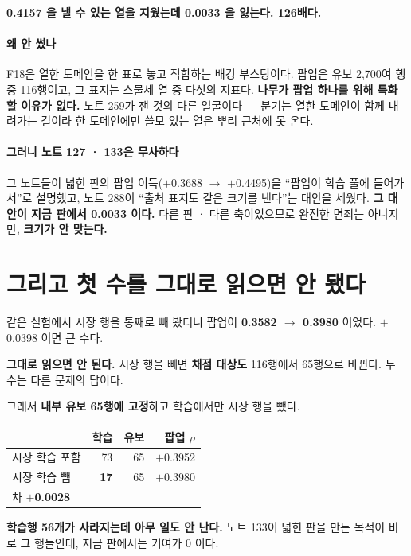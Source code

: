 \documentclass[10pt]{article}
\begin{document}
\textbf{0.4157 을 낼 수 있는 열을 지웠는데 0.0033 을 잃는다. 126배다.}

\paragraph{왜 안 썼나} F18은 열한 도메인을 한 표로 놓고 적합하는 배깅
부스팅이다. 팝업은 유보 2,700여 행 중 116행이고, 그 표지는 스물세 열 중
다섯의 지표다. \textbf{나무가 팝업 하나를 위해 특화할 이유가 없다.} 노트
259가 잰 것의 다른 얼굴이다 --- 분기는 열한 도메인이 함께 내려가는 길이라
한 도메인에만 쓸모 있는 열은 뿌리 근처에 못 온다.

\paragraph{그러니 노트 127 · 133은 무사하다} 그 노트들이 넓힌 판의 팝업
이득($+$0.3688 $\to$ $+$0.4495)을 ``팝업이 학습 풀에 들어가서''로 설명했고,
노트 288이 ``출처 표지도 같은 크기를 낸다''는 대안을 세웠다. \textbf{그
대안이 지금 판에서 0.0033 이다.} 다른 판 · 다른 축이었으므로 완전한 면죄는
아니지만, \textbf{크기가 안 맞는다.}

\section{그리고 첫 수를 그대로 읽으면 안 됐다}

같은 실험에서 시장 행을 통째로 빼 봤더니 팝업이 \textbf{0.3582 $\to$
0.3980} 이었다. $+$0.0398 이면 큰 수다.

\textbf{그대로 읽으면 안 된다.} 시장 행을 빼면 \textbf{채점 대상도} 116행에서
65행으로 바뀐다. 두 수는 다른 문제의 답이다.

그래서 \textbf{내부 유보 65행에 고정}하고 학습에서만 시장 행을 뺐다.

\begin{center}\small
\begin{tabular}{lrrr}
\hline
& 학습 & 유보 & 팝업 $\rho$ \\
\hline
시장 학습 포함 & 73 & 65 & $+$0.3952 \\
시장 학습 뺌 & \textbf{17} & 65 & $+$0.3980 \\
\hline
\multicolumn{4}{l}{차 \textbf{$+$0.0028}} \\
\hline
\end{tabular}
\end{center}

\textbf{학습행 56개가 사라지는데 아무 일도 안 난다.} 노트 133이 넓힌 판을
만든 목적이 바로 그 행들인데, 지금 판에서는 기여가 0 이다.
\end{document}
